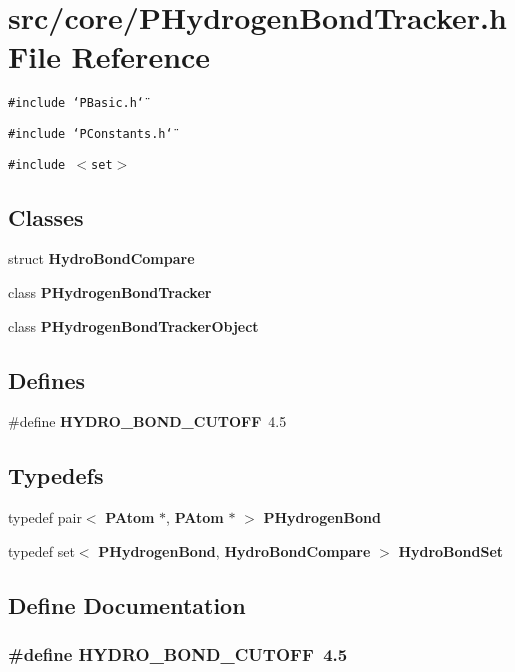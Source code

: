 \section{src/core/PHydrogen\-Bond\-Tracker.h File Reference}
\label{PHydrogenBondTracker_8h}


{\tt \#include \char`\"{}PBasic.h\char`\"{}}\par
{\tt \#include \char`\"{}PConstants.h\char`\"{}}\par
{\tt \#include $<$set$>$}\par
\subsection*{Classes}
\begin{CompactItemize}
\item 
struct {\bf Hydro\-Bond\-Compare}
\item 
class {\bf PHydrogen\-Bond\-Tracker}
\item 
class {\bf PHydrogen\-Bond\-Tracker\-Object}
\end{CompactItemize}
\subsection*{Defines}
\begin{CompactItemize}
\item 
\#define {\bf HYDRO\_\-BOND\_\-CUTOFF}~4.5
\end{CompactItemize}
\subsection*{Typedefs}
\begin{CompactItemize}
\item 
typedef pair$<$ {\bf PAtom} $\ast$, {\bf PAtom} $\ast$ $>$ {\bf PHydrogen\-Bond}
\item 
typedef set$<$ {\bf PHydrogen\-Bond}, {\bf Hydro\-Bond\-Compare} $>$ {\bf Hydro\-Bond\-Set}
\end{CompactItemize}


\subsection{Define Documentation}
\subsubsection{\setlength{\rightskip}{0pt plus 5cm}\#define HYDRO\_\-BOND\_\-CUTOFF~4.5}\label{PHydrogenBondTracker_8h_c4008d020eb4fc1e4845754bc72d7acb}




